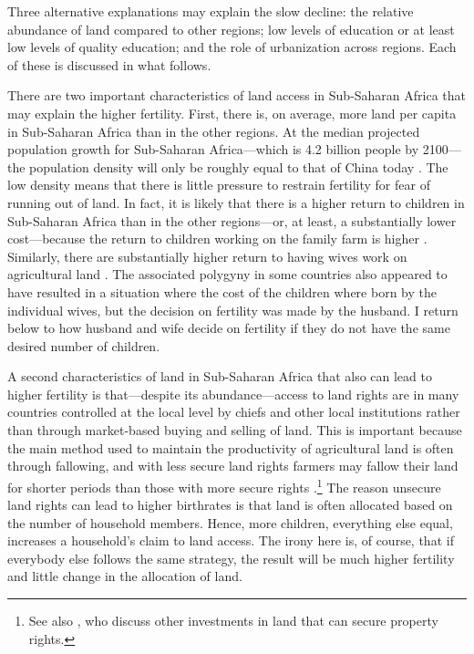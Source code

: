 Three alternative explanations may explain the slow decline: the relative abundance of land compared to other regions; low levels of education or at least low levels of quality education; and the role of urbanization across regions. Each of these is discussed in what follows.

There are two important characteristics of land access in Sub-Saharan Africa that may explain the higher fertility. First, there is, on average, more land per capita in Sub-Saharan Africa than in the other regions. At the median projected population growth for Sub-Saharan Africa---which is 4.2 billion people by 2100---the population density will only be roughly equal to that of China today \citep[p 235]{Gerland2014}. The low density means that there is little pressure to restrain fertility for fear of running out of land. In fact, it is likely that there is a higher return to children in Sub-Saharan Africa than in the other regions---or, at least, a substantially lower cost---because the return to children working on the family farm is higher \citep{Caldwell1992,Bongaarts2013a}. Similarly, there are substantially higher return to having wives work on agricultural land \citep{jacoby95,Matz2016}. The associated polygyny in some countries also appeared to have resulted in a situation where the cost of the children where born by the individual wives, but the decision on fertility was made by the husband. I return below to how husband and wife decide on fertility if they do not have the same desired number of children.

A second characteristics of land in Sub-Saharan Africa that also can lead to higher fertility is that---despite its abundance---access to land rights are in many countries controlled at the local level by chiefs and other local institutions rather than through market-based buying and selling of land. This is important because the main method used to maintain the productivity of agricultural land is often through fallowing, and with less secure land rights farmers may fallow their land for shorter periods than those with more secure rights \citep{Goldstein2008}.\footnote{See also \citet{besley95c}, who discuss other investments in land that can secure property rights.} The reason unsecure land rights can lead to higher birthrates is that land is often allocated based on the number of household members. Hence, more children, everything else equal, increases a household's claim to land access. The irony here is, of course, that if everybody else follows the same strategy, the result will be much higher fertility and little change in the allocation of land.

